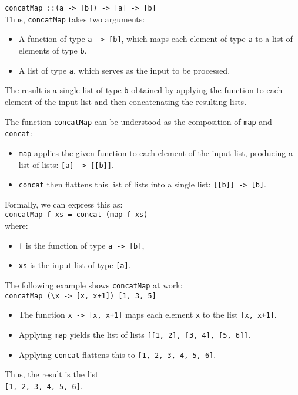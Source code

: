 \begin{enumerate}[(a)]
      \texttt{concatMap ::\;(a -> [b]) -> [a] -> [b]}
      \\[0.2cm]
      Thus, \texttt{concatMap} takes two arguments:
      \begin{itemize}
      \item A function of type \texttt{a -> [b]}, which maps each element of type \texttt{a} to a list of elements
            of type \texttt{b}. 
      \item A list of type \texttt{a}, which serves as the input to be processed.
      \end{itemize}
      The result is a single list of type \texttt{b} obtained by applying the function to each element of the
      input list and then concatenating the resulting lists. 

      The function \texttt{concatMap} can be understood as the composition of \texttt{map} and \texttt{concat}:
      \begin{itemize}
      \item \texttt{map} applies the given function to each element of the input list, producing a list of lists:
            \texttt{[a] -> [[b]]}. 
      \item \texttt{concat} then flattens this list of lists into a single list: \texttt{[[b]] -> [b]}.
      \end{itemize}
      Formally, we can express this as:
      \\[0.2cm]
      \hspace*{1.3cm}
      \texttt{concatMap f xs = concat (map f xs)}
      \\[0.2cm]
      where:
      \begin{itemize}
      \item \texttt{f} is the function of type \texttt{a -> [b]},
      \item \texttt{xs} is the input list of type \texttt{[a]}.
      \end{itemize}
      The following example shows \texttt{concatMap} at work:
      \\[0.2cm]
      \hspace*{1.3cm}
      \texttt{concatMap (\textbackslash x -> [x, x+1]) [1, 3, 5]}
      \begin{itemize}
      \item The function \texttt{x -> [x, x+1]} maps each element \texttt{x} to the list \texttt{[x, x+1]}.
      \item Applying \texttt{map} yields the list of lists  \texttt{[[1, 2], [3, 4], [5, 6]]}.
      \item Applying \texttt{concat} flattens this to \texttt{[1, 2, 3, 4, 5, 6]}.
      \end{itemize}
      Thus, the result is the list
      \\[0.2cm]
      \hspace*{1.3cm}
      \texttt{[1, 2, 3, 4, 5, 6]}.   
\end{enumerate}

